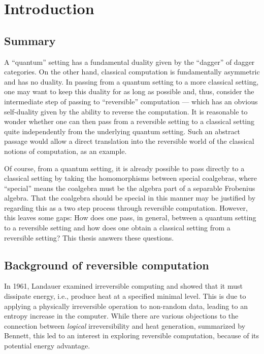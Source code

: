 \chapter{Introduction}\label{chap:introduction}
\section{Summary}\label{sec:summary}
A ``quantum'' setting has a fundamental duality given by the ``dagger'' of dagger
categories\cite{selinger05:dagger,abramsky05:abstractscalars}. On the other hand, classical
computation is fundamentally asymmetric and has no duality. In passing from a quantum setting to a more classical setting, one
may want to keep this duality for as long as possible and, thus, consider the intermediate step of
passing to ``reversible'' computation --- which has an obvious self-duality given by the ability to
reverse the computation. It is reasonable to
wonder whether one can then pass from a reversible setting to a classical setting quite
independently from the underlying quantum setting. Such an abstract
passage would allow a direct translation into the reversible world of the classical notions of
computation, as an example.

Of course, from a quantum setting, it is already possible to pass directly to a classical setting by
taking the homomorphisms between special coalgebras, where ``special'' means the coalgebra must be
the algebra part of a separable Frobenius algebra. That the coalgebra should be special in this manner
may be justified by regarding this as a two step process through reversible computation. However,
this leaves some gaps: How does one pass, in general, between a quantum setting to a reversible
setting and how does one obtain a classical setting from a reversible setting? This thesis answers
these questions.
\section{Background of reversible computation}
\label{sec:background}

In 1961, Landauer\cite{landauer1961irreversibility} examined irreversible computing
and showed that it must dissipate energy, i.e., produce heat at a specified minimal level. This is
due to applying a physically irreversible operation to non-random data, leading to an entropy
increase in the computer. While there are various objections to the connection between
\emph{logical} irreversibility and heat generation, summarized by Bennett\cite{bennett2003notes},
this led to an interest in exploring reversible computation, because of its potential energy advantage.

